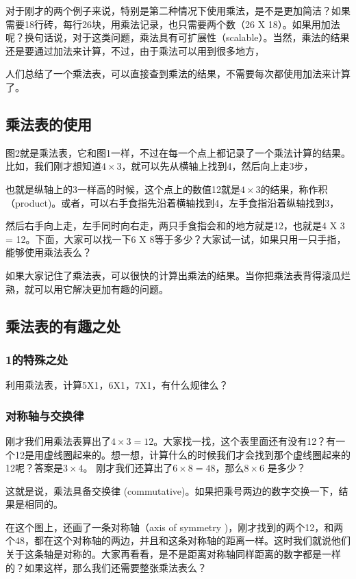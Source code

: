 对于刚才的两个例子来说，特别是第二种情况下使用乘法，是不是更加简洁？如果需要18行砖，每行26块，用乘法记录，也只需要两个数（26 X 18）。如果用加法呢？换句话说，对于这类问题，乘法具有可扩展性（scalable）。当然，乘法的结果还是要通过加法来计算，不过，由于乘法可以用到很多地方，

人们总结了一个乘法表，可以直接查到乘法的结果，不需要每次都使用加法来计算了。
\subsection{乘法表的使用} 图2就是乘法表，它和图1一样，不过在每一个点上都记录了一个乘法计算的结果。比如，我们刚才想知道$4\times3$，就可以先从横轴上找到4，然后向上走3步，

也就是纵轴上的3一样高的时候，这个点上的数值12就是$4\times3$的结果，称作积（product)。或者，可以右手食指先沿着横轴找到4，左手食指沿着纵轴找到3，

然后右手向上走，左手同时向右走，两只手食指会和的地方就是12，也就是4 X 3 = 12。下面，大家可以找一下6 X 8等于多少？大家试一试，如果只用一只手指，能够使用乘法表么？

如果大家记住了乘法表，可以很快的计算出乘法的结果。当你把乘法表背得滚瓜烂熟，就可以用它解决更加有趣的问题。
\subsection{乘法表的有趣之处}
\subsubsection{1的特殊之处}
利用乘法表，计算5X1，6X1，7X1，有什么规律么？

\subsubsection{对称轴与交换律} 
刚才我们用乘法表算出了$4\times3=12$。大家找一找，这个表里面还有没有12？有一个12是用虚线圈起来的。想一想，计算什么的时候我们才会找到那个虚线圈起来的12呢？答案是$3\times4$。
刚才我们还算出了$6\times8 = 48$，那么$8\times6$ 是多少？

这就是说，乘法具备交换律 (commutative)。如果把乘号两边的数字交换一下，结果是相同的。

在这个图上，还画了一条对称轴（axis of symmetry )，刚才找到的两个12，和两个48，都在这个对称轴的两边，并且和这条对称轴的距离一样。这时我们就说他们关于这条轴是对称的。大家再看看，是不是距离对称轴同样距离的数字都是一样的？如果这样，那么我们还需要整张乘法表么？

